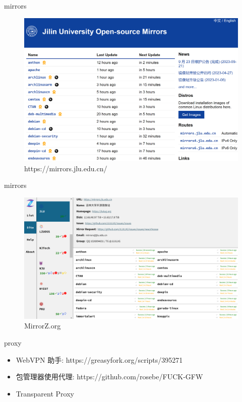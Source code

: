 \documentclass{beamer}
\begin{document}
\begin{frame}{mirrors}
    \begin{figure}[c]
        \centering
        \includegraphics[height=.8\textheight]{pic/mirror.png}
        \caption{https://mirrors.jlu.edu.cn/}
    \end{figure}
\end{frame}

\begin{frame}{mirrors}
    \begin{figure}[c]
        \centering
        \includegraphics[height=.7\textheight]{pic/mirrorz.png}
        \caption{MirrorZ.org}
    \end{figure}
\end{frame}

\begin{frame}{proxy}
    \begin{itemize}
        \item WebVPN 助手: https://greasyfork.org/scripts/395271
        \item 包管理器使用代理: https://github.com/rosebe/FUCK-GFW
        \item Transparent Proxy
    \end{itemize}
\end{frame}
\end{document}
